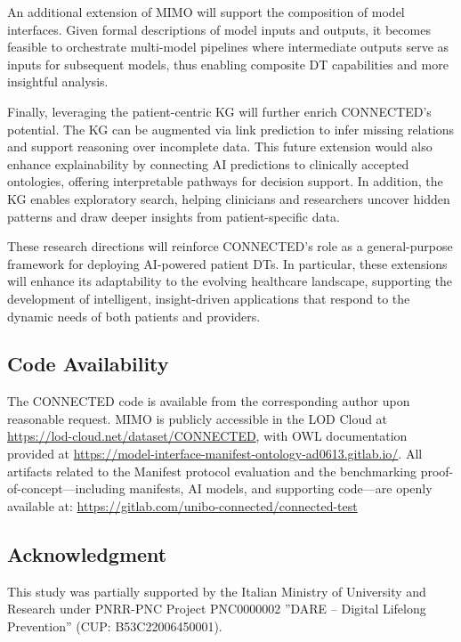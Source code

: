 An additional extension of MIMO will support the composition of model interfaces. Given formal descriptions of model inputs and outputs, it becomes feasible to orchestrate multi-model pipelines where intermediate outputs serve as inputs for subsequent models, thus enabling composite DT capabilities and more insightful analysis.

Finally, leveraging the patient-centric KG will further enrich CONNECTED's potential. The KG can be augmented via link prediction to infer missing relations and support reasoning over incomplete data. This future extension would also enhance explainability by connecting AI predictions to clinically accepted ontologies, offering interpretable pathways for decision support. In addition, the KG enables exploratory search, helping clinicians and researchers uncover hidden patterns and draw deeper insights from patient-specific data.

These research directions will reinforce CONNECTED’s role as a general-purpose framework for deploying AI-powered patient DTs. In particular, these extensions will enhance its adaptability to the evolving healthcare landscape, supporting the development of intelligent, insight-driven applications that respond to the dynamic needs of both patients and providers.

\subsection*{Code Availability}
The CONNECTED code is available from the corresponding author upon reasonable request. MIMO is publicly accessible in the LOD Cloud at \url{https://lod-cloud.net/dataset/CONNECTED}, with OWL documentation provided at \url{https://model-interface-manifest-ontology-ad0613.gitlab.io/}. All artifacts related to the Manifest protocol evaluation and the benchmarking proof-of-concept—including manifests, AI models, and supporting code—are openly available at: 
\url{https://gitlab.com/unibo-connected/connected-test}

\subsection*{Acknowledgment}
This study was partially supported by the Italian Ministry of University and Research under PNRR-PNC Project PNC0000002 ”DARE – Digital Lifelong Prevention” (CUP: B53C22006450001).

\FloatBarrier
